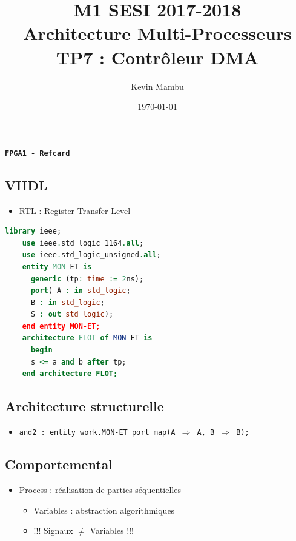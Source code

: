 \documentclass[10pt]{article}
\author{Kevin Mambu}
\date{\today}
\title{M1 SESI 2017-2018\\Architecture Multi-Processeurs\\TP7 : Contrôleur DMA}
\begin{document}
\begin{center}
  \texttt{\textbf{FPGA1 - Refcard}}
\end{center}
\begin{multicols}{2}
  \section{VHDL}
  \begin{itemize}
    \item RTL : Register Transfer Level
  \end{itemize}
  \begin{minipage}[t]{8cm}
    \begin{lstlisting}[language=VHDL]
    library ieee;
    use ieee.std_logic_1164.all;
    use ieee.std_logic_unsigned.all;
    entity MON-ET is
      generic (tp: time := 2ns);
      port( A : in std_logic;
      B : in std_logic;
      S : out std_logic);
    end entity MON-ET;
    architecture FLOT of MON-ET is
      begin
      s <= a and b after tp;
    end architecture FLOT;
    \end{lstlisting}
  \end{minipage}
  \subsection{Architecture structurelle}
  \begin{itemize}
    \item \texttt{and2 : entity work.MON-ET port map(A $\Rightarrow$ A,
    B $\Rightarrow$ B);}
  \end{itemize}

  \subsection{Comportemental}
  \begin{itemize}
    \item Process : réalisation de parties séquentielles
    \begin{itemize}
      \item Variables : abstraction algorithmiques
      \item !!! Signaux $\neq$ Variables !!!
    \end{itemize}
  \end{itemize}


\end{multicols}
\end{document}
